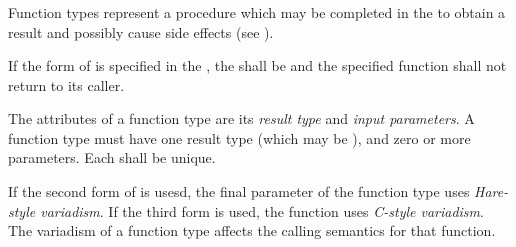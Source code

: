 
\begin{grammar}
 \\
	   \\

 \\
	\terminal{(}  \terminal{)}  \\

 \\
	 \\

 \\
	 \optional{\terminal{,}} \\
	  \optional{\terminal{,}} \\
	 \terminal{,}  \optional{\terminal{,}} \\

 \\
	 \\
	 \terminal{,}  \\

 \\
	 \terminal{:}  \\
\end{grammar}

\specsubsubitem
Function types represent a procedure which may be completed in the
 to obtain a result and possibly cause side
effects (see ).

\specsubsubitem
If the  form of  is specified in
the , the  shall be
 and the specified function shall not return to its caller.

\specsubsubitem
The attributes of a function type are its \textit{result type} and
\textit{input parameters}. A function type must have one result type (which may
be ), and zero or more parameters. Each  shall
be unique.

\specsubsubitem
If the second form of  is usesd, the final parameter of
the function type uses \textit{Hare-style variadism}. If the third form is
used, the function uses \textit{C-style variadism}. The variadism of a function
type affects the calling semantics for that function.

